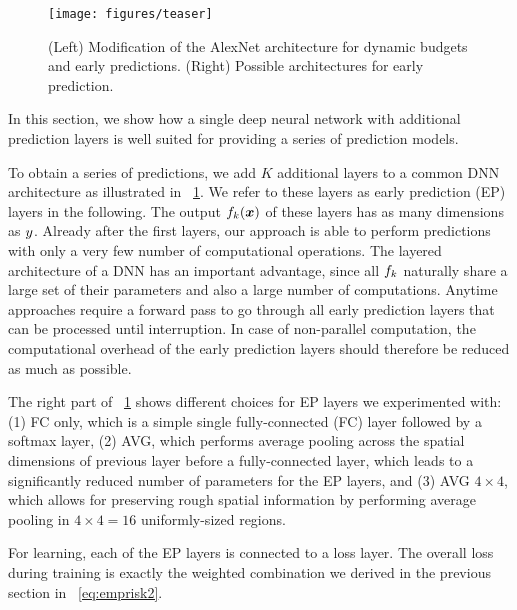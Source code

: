 \documentclass{bmvc2k}
\begin{document}
    \begin{figure}[tb]
        \centering
        \texttt{[image: figures/teaser]}
        \caption{(Left) Modification of the AlexNet architecture for dynamic budgets and early predictions. (Right) Possible architectures
        for early prediction.}
        \label{fig:architecture}
    \end{figure}

    In this section, we show how a single deep neural network
    with additional prediction layers is well suited for providing a series
    of prediction models.

    To obtain a series of predictions, we add
    $K$ additional layers to a common DNN architecture as
    illustrated in \figurename~\ref{fig:architecture}.
    We refer to these layers as early prediction (EP) layers in the following.
    The output $f_k(\bm{x})$ of these layers has as many dimensions as $y$.
    Already after the first layers, our approach is able to perform predictions
    with only a very few number of computational operations.
    The layered architecture of a DNN has an important advantage, since
    all $f_k$ naturally share a large set of their parameters and
    also a large number of computations.
    Anytime approaches
    require a forward pass to go through all
    early prediction layers that can be processed until interruption.
    In case of non-parallel computation, the computational
    overhead of the early prediction layers should therefore be reduced
    as much as possible.

    The right part of \figurename~\ref{fig:architecture}
    shows different choices for EP layers we experimented
    with: (1) FC only, which is a simple single fully-connected (FC) layer followed by a softmax layer,
    (2) AVG, which performs average pooling across the spatial dimensions of previous layer before
    a fully-connected layer, which leads to a significantly reduced number of parameters for the EP layers,
    and (3) AVG $4 \times 4$, which allows for preserving rough spatial information
    by performing average pooling in $4 \times 4 = 16$ uniformly-sized regions.

    For learning, each of the EP layers is connected to a loss layer.
    The overall loss during training is exactly the weighted combination we derived in the
    previous section in \equationname~\eqref{eq:emprisk2}.
\end{document}
